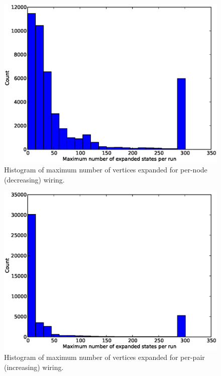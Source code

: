 \begin{figure}[H]
\begin{center}
\includegraphics[width=\textwidth]{Images/max_expanded_per_node_decreasing.eps}
\caption{Histogram of maximum number of vertices expanded for per-node
(decreasing) wiring.}
\label{fig:max_expanded_per_node_decreasing}
\end{center}
\end{figure}

\begin{figure}[H]
\begin{center}
\includegraphics[width=\textwidth]{Images/max_expanded_per_pair_increasing.eps}
\caption{Histogram of maximum number of vertices expanded for per-pair
(increasing) wiring.}
\label{fig:max_expanded_per_pair_increasing}
\end{center}
\end{figure}

